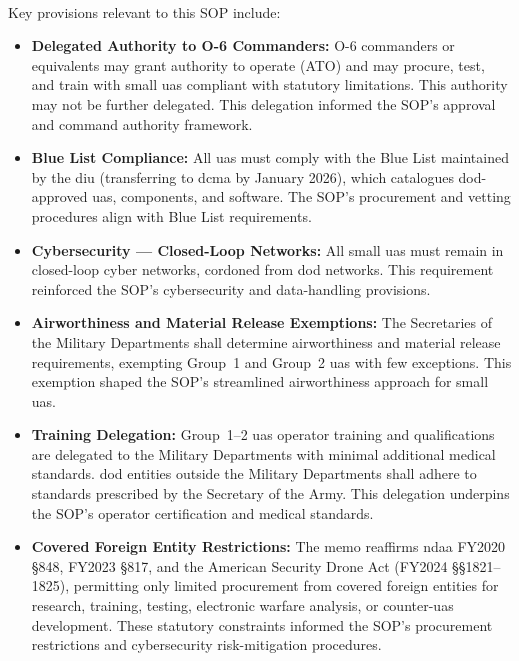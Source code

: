         \paragraph{} Key provisions relevant to this SOP include:

        \begin{itemize}
            \item \textbf{Delegated Authority to O-6 Commanders:} O-6 commanders or equivalents may grant authority to operate (ATO) and may procure, test, and train with small \ac{uas} compliant with statutory limitations.  This authority may not be further delegated. This delegation informed the SOP's approval and command authority framework.
            \item \textbf{Blue List Compliance:} All \ac{uas} must comply with the Blue List maintained by the \ac{diu} (transferring to \ac{dcma} by January 2026), which catalogues \ac{dod}-approved \ac{uas}, components, and software.  The SOP's procurement and vetting procedures align with Blue List requirements.
            \item \textbf{Cybersecurity --- Closed-Loop Networks:} All small \ac{uas} must remain in closed-loop cyber networks, cordoned from \ac{dod} networks.  This requirement reinforced the SOP's cybersecurity and data-handling provisions.
            \item \textbf{Airworthiness and Material Release Exemptions:} The Secretaries of the Military Departments shall determine airworthiness and material release requirements, exempting Group~1 and Group~2 \ac{uas} with few exceptions.  This exemption shaped the SOP's streamlined airworthiness approach for small \ac{uas}.
            \item \textbf{Training Delegation:} Group~1--2 \ac{uas} operator training and qualifications are delegated to the Military Departments with minimal additional medical standards.  \ac{dod} entities outside the Military Departments shall adhere to standards prescribed by the Secretary of the Army.  This delegation underpins the SOP's operator certification and medical standards.
            \item \textbf{Covered Foreign Entity Restrictions:} The memo reaffirms \ac{ndaa} FY2020 {\S}848, FY2023 {\S}817, and the American Security Drone Act (FY2024 {\S\S}1821--1825), permitting only limited procurement from covered foreign entities for research, training, testing, electronic warfare analysis, or counter-\ac{uas} development.  These statutory constraints informed the SOP's procurement restrictions and cybersecurity risk-mitigation procedures.

\end{itemize}
